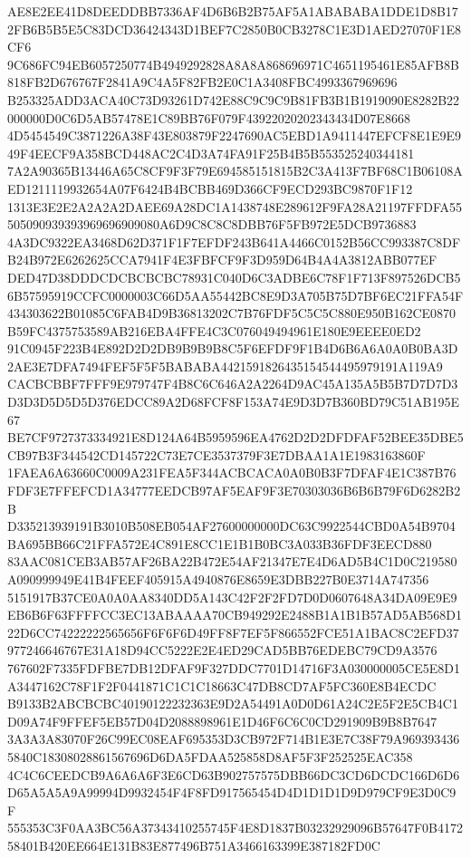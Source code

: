 \documentclass[UTF8,fontset=fandol,zihao=-4,a4paper]{ctexart}
\begin{document}
{{AE8E2EE41D8DEEDDBB7336AF4D6B6B2B75AF5A1ABABABA1DDE1D8B172FB6B5B5E5C83DCD36424343D1BEF7C2850B0CB3278C1E3D1AED27070F1E8CF6
9C686FC94EB6057250774B4949292828A8A8A868696971C4651195461E85AFB8B818FB2D676767F2841A9C4A5F82FB2E0C1A3408FBC4993367969696
B253325ADD3ACA40C73D93261D742E88C9C9C9B81FB3B1B1919090E8282B22000000D0C6D5AB57478E1C89BB76F079F43922020202343434D07E8668
4D5454549C3871226A38F43E803879F2247690AC5EBD1A9411447EFCF8E1E9E949F4EECF9A358BCD448AC2C4D3A74FA91F25B4B5B553525240344181
7A2A90365B13446A65C8CF9F3F79E694585151815B2C3A413F7BF68C1B06108AED1211119932654A07F6424B4BCBB469D366CF9ECD293BC9870F1F12
1313E3E2E2A2A2A2DAEE69A28DC1A1438748E289612F9FA28A21197FFDFA55505090939393969696909080A6D9C8C8C8DBB76F5FB972E5DCB9736883
4A3DC9322EA3468D62D371F1F7EFDF243B641A4466C0152B56CC993387C8DFB24B972E6262625CCA7941F4E3FBFCF9F3D959D64B4A4A3812ABB077EF
DED47D38DDDCDCBCBCBC78931C040D6C3ADBE6C78F1F713F897526DCB56B57595919CCFC0000003C66D5AA55442BC8E9D3A705B75D7BF6EC21FFA54F
434303622B01085C6FAB4D9B36813202C7B76FDF5C5C5C880E950B162CE0870B59FC4375753589AB216EBA4FFE4C3C076049494961E180E9EEEE0ED2
91C0945F223B4E892D2D2DB9B9B9B8C5F6EFDF9F1B4D6B6A6A0A0B0BA3D2AE3E7DFA7494FEF5F5F5BABABA4421591826435154544495979191A119A9
CACBCBBF7FFF9E979747F4B8C6C646A2A2264D9AC45A135A5B5B7D7D7D3D3D3D5D5D5D376EDCC89A2D68FCF8F153A74E9D3D7B360BD79C51AB195E67
BE7CF9727373334921E8D124A64B5959596EA4762D2D2DFDFAF52BEE35DBE5CB97B3F344542CD145722C73E7CE3537379F3E7DBAA1A1E1983163860F
1FAEA6A63660C0009A231FEA5F344ACBCACA0A0B0B3F7DFAF4E1C387B76FDF3E7FFEFCD1A34777EEDCB97AF5EAF9F3E70303036B6B6B79F6D6282B2B
D335213939191B3010B508EB054AF27600000000DC63C9922544CBD0A54B9704BA695BB66C21FFA572E4C891E8CC1E1B1B0BC3A033B36FDF3EECD880
83AAC081CEB3AB57AF26BA22B472E54AF21347E7E4D6AD5B4C1D0C219580A090999949E41B4FEEF405915A4940876E8659E3DBB227B0E3714A747356
5151917B37CE0A0A0AA8340DD5A143C42F2F2FD7D0D0607648A34DA09E9E9EB6B6F63FFFFCC3EC13ABAAAA70CB949292E2488B1A1B1B57AD5AB568D1
22D6CC74222222565656F6F6F6D49FF8F7EF5F866552FCE51A1BAC8C2EFD37977246646767E31A18D94CC5222E2E4ED29CAD5BB76EDEBC79CD9A3576
767602F7335FDFBE7DB12DFAF9F327DDC7701D14716F3A030000005CE5E8D1A3447162C78F1F2F0441871C1C1C18663C47DB8CD7AF5FC360E8B4ECDC
B9133B2ABCBCBC40190122232363E9D2A54491A0D0D61A24C2E5F2E5CB4C1D09A74F9FFEF5EB57D04D2088898961E1D46F6C6C0CD291909B9B8B7647
3A3A3A83070F26C99EC08EAF695353D3CB972F714B1E3E7C38F79A9693934365840C18308028861567696D6DA5FDAA525858D8AF5F3F252525EAC358
4C4C6CEEDCB9A6A6A6F3E6CD63B902757575DBB66DC3CD6DCDC166D6D6D65A5A5A9A99994D9932454F4F8FD917565454D4D1D1D1D9D979CF9E3D0C9F
555353C3F0AA3BC56A37343410255745F4E8D1837B03232929096B57647F0B417258401B420EE664E131B83E877496B751A3466163399E387182FD0C
}}
\end{document}
